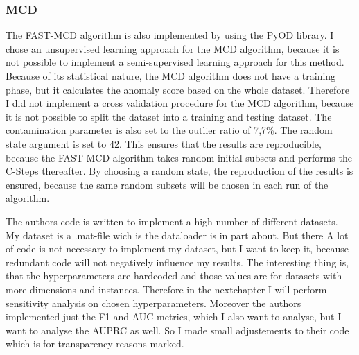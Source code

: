 \subsubsection*{MCD}
The FAST-MCD algorithm is also implemented by using the PyOD library. 
I chose an unsupervised learning approach for the MCD algorithm, because it is not possible to implement a semi-supervised learning approach for this method.
Because of its statistical nature, the MCD algorithm does not have a training phase, but it calculates the anomaly score based on the whole dataset.
Therefore I did not implement a cross validation procedure for the MCD algorithm, because it is not possible to split the dataset into a training and testing dataset.
The contamination parameter is also set to the outlier ratio of 7,7\%.
The random state argument is set to 42. 
This ensures that the results are reproducible, because the FAST-MCD algorithm takes random initial subsets and performs the C-Steps thereafter.
By choosing a random state, the reproduction of the results is ensured, because the same random subsets will be chosen in each run of the algorithm.


The authors code is written to implement a high number of different datasets.
My dataset is a .mat-file wich is the dataloader is in part about.
But there 
A lot of code is not necessary to implement my dataset, but I want to keep it, because redundant code will not negatively influence my results.
The interesting thing is, that the hyperparameters are hardcoded and those values are for datasets with more dimensions and instances.
Therefore in the nextchapter I will perform sensitivity analysis on chosen hyperparameters.
Moreover the authors implemented just the F1 and AUC metrics, which I also want to analyse, but I want to analyse the AUPRC as well.
So I made small adjustements to their code which is for transparency reasons marked.






